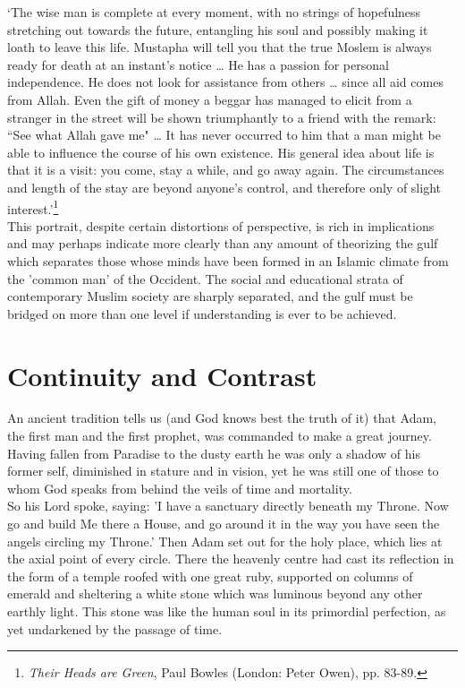 \documentclass[10pt, twoside]{book}
\begin{document}
`The wise man is complete at every moment, with no strings of hopefulness stretching out towards the future, entangling his soul and possibly making it loath to leave this life. Mustapha will tell you that the true Moslem is always ready for death at an instant's notice \ldots{} He has a passion for personal independence. He does not look for assistance from others \ldots{} since all aid comes from Allah. Even the gift of money a beggar has managed to elicit from a stranger in the street will be shown triumphantly to a friend with the remark: ``See what Allah gave me" \ldots{} It has never occurred to him that a man might be able to influence the course of his own existence. His general idea about life is that it is a visit: you come, stay a while, and go away again. The circumstances and length of the stay are beyond anyone's control, and therefore only of slight interest.'\footnote{\emph{Their Heads are Green}, Paul Bowles (London: Peter Owen), pp. 83-89.}\\

This portrait, despite certain distortions of perspective, is rich in implications and may perhaps indicate more clearly than any amount of theorizing the gulf which separates those whose minds have been formed in an Islamic climate from the 'common man' of the Occident. The social and educational strata of contemporary Muslim society are sharply separated, and the gulf must be bridged on more than one level if understanding is ever to be achieved. \\

\chapter{Continuity and Contrast}

An ancient tradition tells us (and God knows best the truth of it) that Adam, the first man and the 
first prophet, was commanded to make a great journey. Having fallen from Paradise to the dusty earth 
he was only a shadow of his former self, diminished in stature and in vision, yet he was still one of 
those to whom God speaks from behind the veils of time and mortality. \\

So his Lord spoke, saying: 'I have a sanctuary directly beneath my Throne. Now go and build Me there 
a House, and go around it in the way you have seen the angels circling my Throne.' Then Adam set out 
for the holy place, which lies at the axial point of every circle. There the heavenly centre had cast 
its reflection in the form of a temple roofed with one great ruby, supported on columns of emerald 
and sheltering a white stone which was luminous beyond any other earthly light. This stone was like 
the human soul in its primordial perfection, as yet undarkened by the passage of time. \\
\end{document}
